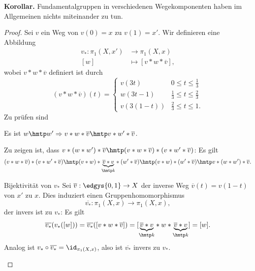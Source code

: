 \documentclass[language=ngerman]{TemplateLecture} %
\begin{document}
\textbf{Korollar.} Fundamentalgruppen in verschiedenen Wegekomponenten haben im Allgemeinen nichts miteinander zu tun.

\begin{proof}
    Sei $v$ ein Weg von $v(0) = x$ zu $v(1) = x'$. Wir definieren eine Abbildung 
    \begin{align*}
        v_*: \pi_1(X, x') &\longrightarrow \pi_1(X, x) \\
        [w] &\longmapsto [v * w * \overline{v}],
    \end{align*}
    wobei $v * w * \overline{v}$ definiert ist durch 
    \begin{equation*}
        (v * w * \overline{v}) (t) = \begin{cases}
            v(3t) & 0 \leq t \leq \frac{1}{3} \\
            w(3t-1) & \frac{1}{3} \leq t \leq \frac{2}{3} \\
            v(3(1-t)) & \frac{2}{3} \leq t \leq 1.
        \end{cases}
    \end{equation*}
    Zu prüfen sind 
    \begin{description}
        \item[Wohldefiniertheit:] Es ist $w \hmtp w' \Rightarrow v * w * \overline{v} \hmtp v * w' * \overline{v}$.
        \item[$v_*$ ist Gruppenhomomorphismus:] Zu zeigen ist, dass $v * (w * w') * \overline{v} \hmtp (v * w * \overline{v}) * (v * w' * \overline{v})$: Es gilt 
        \begin{align*}
            (v * w * \overline{v}) * (v * w' * \overline{v}) \hmtp (v * w) * \underset{\hmtp k}{\underbrace{\overline{v} * v}} * (w' * \overline{v}) \hmtp (v * w) * (w' * \overline{v}) \hmtp v * (w * w') * \overline{v}.
        \end{align*} 
        \item{Bijektivität von $v_*$} Sei $\overline{v}: \edgys{0,1} \to X$ der inverse Weg $\overline{v}(t) = v(1-t)$ von $x'$ zu $x$. Dies induziert einen Gruppenhomomorphismus 
        \begin{equation*}
            \overline{v_*}: \pi_1(X, x) \to \pi_1(X,x),
        \end{equation*}
        der invers ist zu $v_*$: Es gilt 
        \begin{align*}
            \overline{v_*}(v_*([w])) = \overline{v_*}([v * w * \overline{v}]) = [\underset{\hmtp k}{\underbrace{\overline{v} * v}} * w * \underset{\hmtp k}{\underbrace{\overline{v} * v}}] = [w].
        \end{align*}
        Analog ist $v_* \circ \overline{v_*} = \id_{\pi_1(X,x)}$, also ist $\overline{v_*}$ invers zu $v_*$.
    \end{description}
\end{proof}
\end{document}
